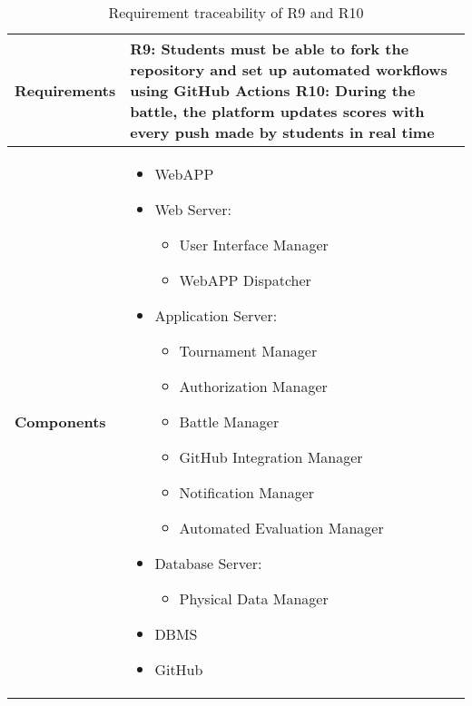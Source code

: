 \begin{table}[h!]
    \centering
    \begin{tabular}{|p{3cm}|p{12cm}|}    \hline
        \textbf{Requirements} & R9: Students must be able to fork the repository and set up automated workflows using GitHub Actions \newline R10: During the battle, the platform updates scores with every push made by students in real time\\
    \hline
        \textbf{Components} & 
            \begin{itemize}
                \item WebAPP
                \item Web Server:
                \begin{itemize}
                    \item User Interface Manager 
                    \item WebAPP Dispatcher
                \end{itemize}
                \item Application Server:
                \begin{itemize}
                    \item Tournament Manager
                    \item Authorization Manager
                    \item Battle Manager
                    \item GitHub Integration Manager
                    \item Notification Manager
                    \item Automated Evaluation Manager
                \end{itemize}
                \item Database Server:
                 \begin{itemize}
                    \item Physical Data Manager
                \end{itemize}
                \item DBMS
                \item GitHub
            \end{itemize}    \\
    \hline
    \end{tabular}
    \caption{Requirement traceability of R9 and R10}
    \label{tab:r9}
\end{table}

